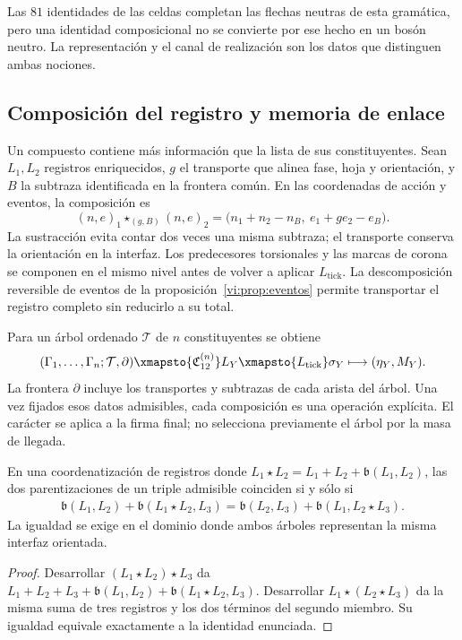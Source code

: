 Las \(81\) identidades de las celdas completan las flechas neutras
de esta gramática, pero una identidad composicional no se convierte por
ese hecho en un bosón neutro. La representación y el canal de realización
son los datos que distinguen ambas nociones.

\subsection{Composición del registro y memoria de enlace}
\label{vi:subsec:composicion-registro}

Un compuesto contiene más información que la lista de sus
constituyentes. Sean \(L_1,L_2\) registros enriquecidos, \(g\) el
transporte que alinea fase, hoja y orientación, y \(B\) la subtraza
identificada en la frontera común. En las coordenadas de acción y
eventos, la composición es
\begin{equation}
 (n,e)_1\star_{(g,B)}(n,e)_2
 =\bigl(n_1+n_2-n_B,\ e_1+ge_2-e_B\bigr).
 \label{vi:eq:composicion-frontera}
\end{equation}
La sustracción evita contar dos veces una misma subtraza; el transporte
conserva la orientación en la interfaz. Los predecesores torsionales y
las marcas de corona se componen en el mismo nivel antes de volver a
aplicar \(L_{\mathrm{tick}}\). La descomposición reversible de eventos
de la proposición~\ref{vi:prop:eventos} permite transportar el registro
completo sin reducirlo a su total.

Para un árbol ordenado \(\mathcal T\) de \(n\) constituyentes se obtiene
\begin{equation}
 (\Gamma_1,\ldots,\Gamma_n;\mathcal T,\partial)
 \xmapsto{\mathfrak C_{12}^{(n)}}L_Y
 \xmapsto{L_{\mathrm{tick}}}\sigma_Y
 \longmapsto (\eta_Y,M_Y).
 \label{vi:eq:cadena-compuesto}
\end{equation}
La frontera \(\partial\) incluye los transportes y subtrazas de cada
arista del árbol. Una vez fijados esos datos admisibles, cada composición
es una operación explícita. El carácter se aplica a la firma final;
no selecciona previamente el árbol por la masa de llegada.

\begin{proposition}
\label{vi:prop:cociclo-compuesto}
En una coordenatización de registros donde
\(L_1\star L_2=L_1+L_2+\mathfrak b(L_1,L_2)\), las dos
parentizaciones de un triple admisible coinciden si y sólo si
\begin{align*}
 \mathfrak b(L_1,L_2)+\mathfrak b(L_1\star L_2,L_3)
 =\mathfrak b(L_2,L_3)+\mathfrak b(L_1,L_2\star L_3).
\end{align*}
La igualdad se exige en el dominio donde ambos árboles representan la
misma interfaz orientada.
\end{proposition}
\begin{proof}
Desarrollar \((L_1\star L_2)\star L_3\) da
\(L_1+L_2+L_3+\mathfrak b(L_1,L_2)+\mathfrak b(L_1\star L_2,L_3)\).
Desarrollar \(L_1\star(L_2\star L_3)\) da la misma suma de tres
registros y los dos términos del segundo miembro. Su igualdad equivale
exactamente a la identidad enunciada.
\end{proof}

